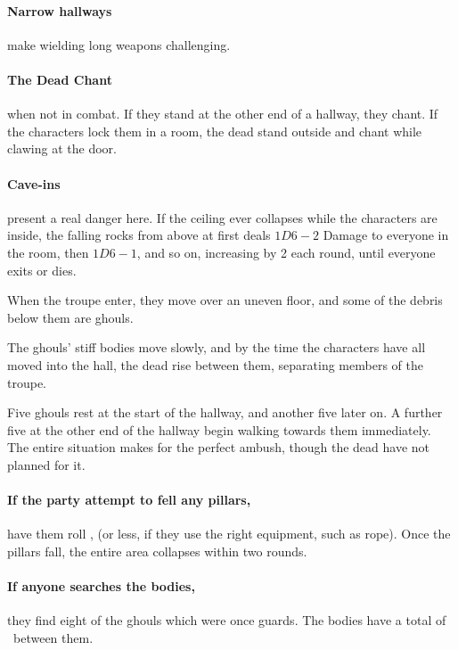 \paragraph{Narrow hallways}
make wielding long weapons challenging.%

\paragraph{The Dead Chant} when not in combat.
If they stand at the other end of a hallway, they chant.
If the characters lock them in a room, the dead stand outside and chant while clawing at the door.

\paragraph{Cave-ins} present a real danger here.  If the ceiling ever collapses while the characters are inside, the falling rocks from above at first deals $1D6-2$ Damage to everyone in the room, then $1D6-1$, and so on, increasing by 2 each round, until everyone exits or dies.


When the troupe enter, they move over an uneven floor, and some of the debris below them are ghouls.

The ghouls' stiff bodies move slowly, and by the time the characters have all moved into the hall, the dead rise between them, separating members of the troupe.

Five ghouls rest at the start of the hallway, and another five later on.
A further five at the other end of the hallway begin walking towards them immediately.
The entire situation makes for the perfect ambush, though the dead have not planned for it.

\paragraph{If the party attempt to fell any pillars,}
have them roll , \tn[13] (or less, if they use the right equipment, such as rope).
Once the pillars fall, the entire area collapses within two rounds.

\paragraph{If anyone searches the bodies,}
they find eight of the ghouls which were once \glspl{guard}.
The bodies have a total of \lootMedium\ between them.

